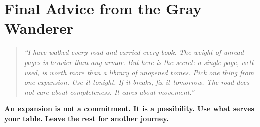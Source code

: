 \section{Final Advice from the Gray Wanderer}

\begin{quote}
\small
\textit{“I have walked every road and carried every book. The weight of unread pages is heavier than any armor. But here is the secret: a single page, well-used, is worth more than a library of unopened tomes. Pick one thing from one expansion. Use it tonight. If it breaks, fix it tomorrow. The road does not care about completeness. It cares about movement.”}
\end{quote}

\textbf{An expansion is not a commitment. It is a possibility. Use what serves your table. Leave the rest for another journey.}